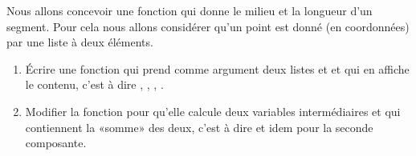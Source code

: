 
\begin{exercice}\label{exoPremiere-0068}

    Nous allons concevoir une fonction qui donne le milieu et la longueur d'un segment. Pour cela nous allons considérer qu'un point est donné (en coordonnées) par une liste \info{[x,y]} à deux éléments.

    \begin{enumerate}
        \item
            Écrire une fonction  qui prend comme argument deux listes  et  et qui en affiche le contenu, c'est à dire , , , .
        \item
            Modifier la fonction pour qu'elle calcule deux variables intermédiaires  et  qui contiennent la «somme» des deux, c'est à dire  et idem pour la seconde composante.
    \end{enumerate}

\end{exercice}
